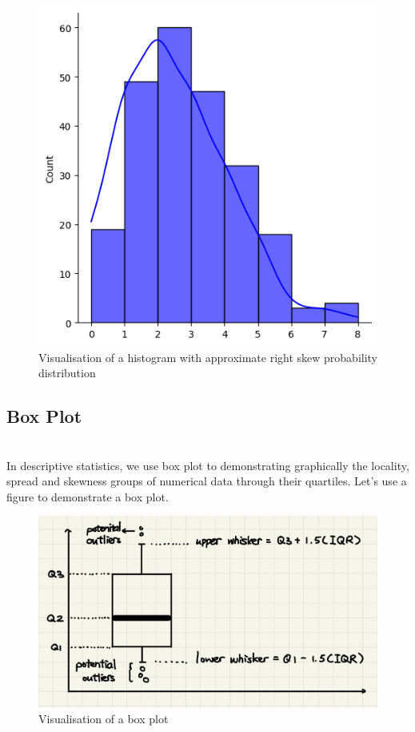 \begin{figure}[H]
 \centering
 \includegraphics[scale=0.35]{Section1/img/HisR.jpg}
 \caption{Visualisation of a histogram with approximate right skew probability distribution}
\end{figure}

\subsection{Box Plot}\\

\noindent
In descriptive statistics, we use box plot to demonstrating graphically the locality, spread and skewness groups of numerical data through their quartiles. Let's use a figure to demonstrate a box plot. 

\begin{figure}[H]
 \centering
 \includegraphics[scale=0.30]{Section1/img/Boxplot.jpg}
 \caption{Visualisation of a box plot}
\end{figure}

